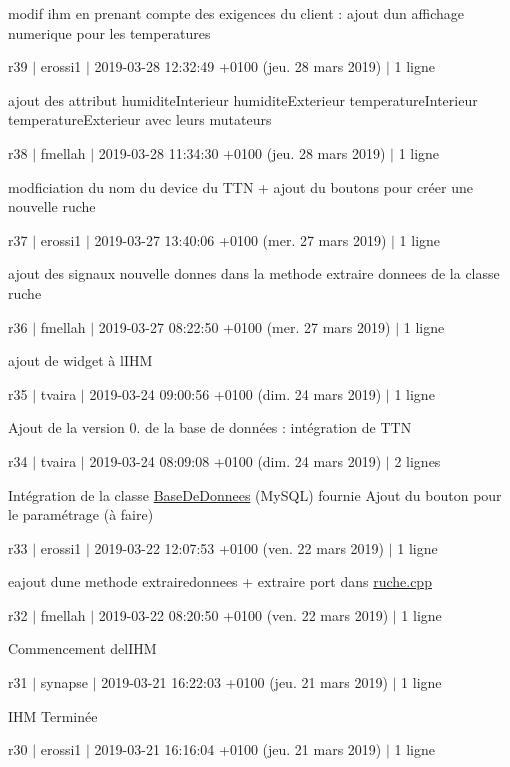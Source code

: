 modif ihm en prenant compte des exigences du client \+: ajout d\textquotesingle{}un affichage numerique pour les temperatures

r39 $\vert$ erossi1 $\vert$ 2019-\/03-\/28 12\+:32\+:49 +0100 (jeu. 28 mars 2019) $\vert$ 1 ligne

ajout des attribut humidite\+Interieur humidite\+Exterieur temperature\+Interieur temperature\+Exterieur avec leurs mutateurs

r38 $\vert$ fmellah $\vert$ 2019-\/03-\/28 11\+:34\+:30 +0100 (jeu. 28 mars 2019) $\vert$ 1 ligne

modficiation du nom du device du T\+TN + ajout du boutons pour créer une nouvelle ruche

r37 $\vert$ erossi1 $\vert$ 2019-\/03-\/27 13\+:40\+:06 +0100 (mer. 27 mars 2019) $\vert$ 1 ligne

ajout des signaux nouvelle donnes dans la methode extraire donnees de la classe ruche

r36 $\vert$ fmellah $\vert$ 2019-\/03-\/27 08\+:22\+:50 +0100 (mer. 27 mars 2019) $\vert$ 1 ligne

ajout de widget à l\textquotesingle{}I\+HM

r35 $\vert$ tvaira $\vert$ 2019-\/03-\/24 09\+:00\+:56 +0100 (dim. 24 mars 2019) $\vert$ 1 ligne

Ajout de la version 0. de la base de données \+: intégration de T\+TN

r34 $\vert$ tvaira $\vert$ 2019-\/03-\/24 08\+:09\+:08 +0100 (dim. 24 mars 2019) $\vert$ 2 lignes

Intégration de la classe \hyperlink{class_base_de_donnees}{Base\+De\+Donnees} (My\+S\+QL) fournie Ajout du bouton pour le paramétrage (à faire)

r33 $\vert$ erossi1 $\vert$ 2019-\/03-\/22 12\+:07\+:53 +0100 (ven. 22 mars 2019) $\vert$ 1 ligne

eajout d\textquotesingle{}une methode extrairedonnees + extraire port dans \hyperlink{ruche_8cpp}{ruche.\+cpp}

r32 $\vert$ fmellah $\vert$ 2019-\/03-\/22 08\+:20\+:50 +0100 (ven. 22 mars 2019) $\vert$ 1 ligne

Commencement del\textquotesingle{}I\+HM

r31 $\vert$ synapse $\vert$ 2019-\/03-\/21 16\+:22\+:03 +0100 (jeu. 21 mars 2019) $\vert$ 1 ligne

I\+HM Terminée

r30 $\vert$ erossi1 $\vert$ 2019-\/03-\/21 16\+:16\+:04 +0100 (jeu. 21 mars 2019) $\vert$ 1 ligne

